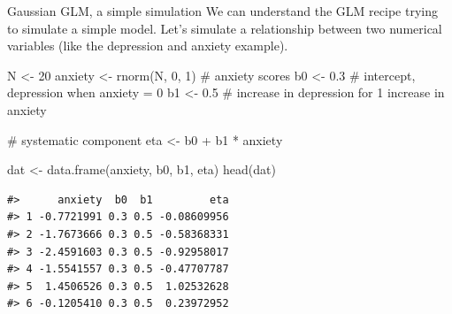 \documentclass[
  ignorenonframetext,
]{beamer}
\newenvironment{Shaded}{\begin{snugshade}}{\end{snugshade}}
\newcommand{\CommentTok}[1]{\textcolor[rgb]{0.37,0.37,0.37}{#1}}
\newcommand{\DecValTok}[1]{\textcolor[rgb]{0.68,0.00,0.00}{#1}}
\newcommand{\FloatTok}[1]{\textcolor[rgb]{0.68,0.00,0.00}{#1}}
\newcommand{\FunctionTok}[1]{\textcolor[rgb]{0.28,0.35,0.67}{#1}}
\newcommand{\NormalTok}[1]{\textcolor[rgb]{0.00,0.23,0.31}{#1}}
\newcommand{\OtherTok}[1]{\textcolor[rgb]{0.00,0.23,0.31}{#1}}
\newcommand{\SpecialCharTok}[1]{\textcolor[rgb]{0.37,0.37,0.37}{#1}}
\begin{document}
\begin{frame}[fragile]{Gaussian GLM, a simple simulation}
\label{gaussian-glm-a-simple-simulation}
We can understand the GLM recipe trying to simulate a simple model.
Let's simulate a relationship between two numerical variables (like the
depression and anxiety example).

\begin{Shaded}
\begin{Highlighting}[]
\NormalTok{N }\OtherTok{\textless{}{-}} \DecValTok{20}
\NormalTok{anxiety }\OtherTok{\textless{}{-}} \FunctionTok{rnorm}\NormalTok{(N, }\DecValTok{0}\NormalTok{, }\DecValTok{1}\NormalTok{) }\CommentTok{\# anxiety scores}
\NormalTok{b0 }\OtherTok{\textless{}{-}} \FloatTok{0.3} \CommentTok{\# intercept, depression when anxiety = 0}
\NormalTok{b1 }\OtherTok{\textless{}{-}} \FloatTok{0.5} \CommentTok{\# increase in depression for 1 increase in anxiety}

\CommentTok{\# systematic component}
\NormalTok{eta }\OtherTok{\textless{}{-}}\NormalTok{ b0 }\SpecialCharTok{+}\NormalTok{ b1 }\SpecialCharTok{*}\NormalTok{ anxiety}

\NormalTok{dat }\OtherTok{\textless{}{-}} \FunctionTok{data.frame}\NormalTok{(anxiety, b0, b1, eta)}
\FunctionTok{head}\NormalTok{(dat)}
\end{Highlighting}
\end{Shaded}

\begin{verbatim}
#>      anxiety  b0  b1         eta
#> 1 -0.7721991 0.3 0.5 -0.08609956
#> 2 -1.7673666 0.3 0.5 -0.58368331
#> 3 -2.4591603 0.3 0.5 -0.92958017
#> 4 -1.5541557 0.3 0.5 -0.47707787
#> 5  1.4506526 0.3 0.5  1.02532628
#> 6 -0.1205410 0.3 0.5  0.23972952
\end{verbatim}
\end{frame}
\end{document}

